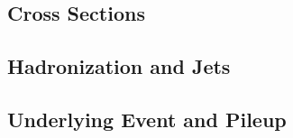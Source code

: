 \subsection{Cross Sections}

\subsection{Hadronization and Jets} \label{sec:pp_physics_jets}

\subsection{Underlying Event and Pileup}
